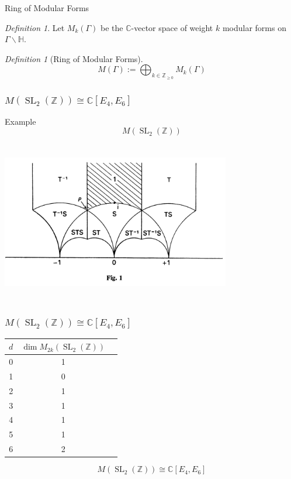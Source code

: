 \documentclass{beamer}
\theoremstyle{remark}
\newtheorem{defn}[thm]{Definition}
\newcommand\BC{{\mathbb C}}
\newcommand\BBZ{{\mathbb Z}}
\newcommand\BZ{{\mathbb Z}}
\newcommand{\SL}{\operatorname{SL}}
\begin{document}

\begin{frame}{Ring of Modular Forms}

\begin{defn}
  Let $M_k(\Gamma)$ be the $\BC$-vector space of weight $k$ modular forms on $\Gamma \backslash \mathbb{H}$.
\end{defn}

\begin{defn}[Ring of Modular Forms]
\[
	M(\Gamma) := \bigoplus_{k \in \BZ_{\geq 0}} M_k(\Gamma)
\]
\end{defn}

\end{frame}


\begin{frame}
\frametitle{$M(\SL_2(\BZ)) \cong \BC[E_4,E_6]$}

\begin{block}{Example}
\[
	M(\SL_2(\BZ))
\]
\end{block}

  \begin{center}
    \includegraphics[width=10cm, height=7cm]{pics/fun-domain-SL2.png}
  \end{center}

\end{frame}


\begin{frame}
\frametitle{$M(\SL_2(\BZ)) \cong \BC[E_4,E_6]$}


\begin{center}
\begin{tabular}{ |c| c| c|}
\hline
$d$  & $\dim M_{2k}(\SL_2(\BBZ))$  \\ 
\hline
0& 1 \\ 
1& 0 \\  
2& 1  \\
3& 1  \\
4& 1  \\
5& 1  \\
6& 2   \\
\hline
\end{tabular}
\end{center}

\[
	M(\SL_2(\BZ)) \cong \BC[E_4,E_6]
\]
\end{frame}
\end{document}
